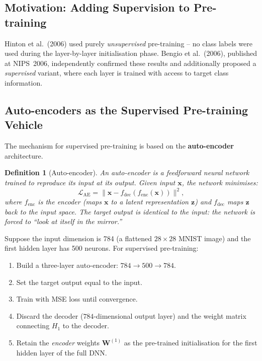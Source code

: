 \documentclass[12pt,a4paper]{article}
\newtheorem{definition}{Definition}[section]
\newcommand{\W}{\mathbf{W}}
\newcommand{\x}{\mathbf{x}}
\newcommand{\loss}{\mathcal{L}}
\begin{document}
\subsection{Motivation: Adding Supervision to Pre-training}

Hinton et al.\ (2006) used purely \emph{unsupervised} pre-training -- no
class labels were used during the layer-by-layer initialisation phase.
Bengio et al.\ (2006), published at NIPS~2006, independently confirmed these
results and additionally proposed a \emph{supervised} variant, where each
layer is trained with access to target class information.

\subsection{Auto-encoders as the Supervised Pre-training Vehicle}

The mechanism for supervised pre-training is based on the
\textbf{auto-encoder} architecture.

\begin{definition}[Auto-encoder]
\label{def:autoencoder}
  An \emph{auto-encoder} is a feedforward neural network trained to reproduce
  its input at its output.  Given input $\x$, the network minimises:
  \begin{equation}
    \loss_{\text{AE}} = \|\x - f_{\text{dec}}(f_{\text{enc}}(\x))\|^2,
    \label{eq:ae-loss}
  \end{equation}
  where $f_{\text{enc}}$ is the \emph{encoder} (maps $\x$ to a latent
  representation $\mathbf{z}$) and $f_{\text{dec}}$ maps $\mathbf{z}$ back
  to the input space.  The target output is identical to the input: the
  network is forced to ``look at itself in the mirror.''
\end{definition}

\begin{example}
  Suppose the input dimension is 784 (a flattened $28 \times 28$ MNIST image)
  and the first hidden layer has 500 neurons.  For supervised pre-training:
  \begin{enumerate}
    \item Build a three-layer auto-encoder: $784 \to 500 \to 784$.
    \item Set the target output equal to the input.
    \item Train with MSE loss until convergence.
    \item Discard the decoder ($784$-dimensional output layer) and the weight
          matrix connecting $H_1$ to the decoder.
    \item Retain the \emph{encoder} weights $\W^{(1)}$ as the pre-trained
          initialisation for the first hidden layer of the full DNN.
  \end{enumerate}
\end{example}
\end{document}
